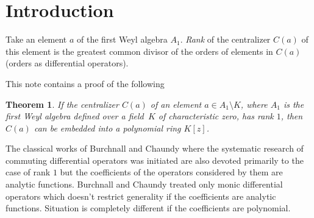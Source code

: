 \documentclass[pdftex]{sigma}
\numberwithin{equation}{section}
\newtheorem{Theorem}{Theorem}[section]
\begin{document}

\newcommand{\arXivNumber}{2101.01138}

\renewcommand{\PaperNumber}{052}

\FirstPageHeading










\section{Introduction}

Take an element $a$ of the first Weyl algebra $A_1$. {\it Rank} of the centralizer $C(a)$ of this element is
the greatest common divisor of the orders of elements in $C(a)$ (orders as differential operators).

This note contains a proof of the following

\begin{Theorem}If the centralizer $C(a)$ of an element $a \in A_1\setminus K$, where $A_1$ is the first Weyl algebra defined over a field~$K$
of characteristic zero, has rank $1$, then $C(a)$ can be embedded into a polynomial ring $K[z]$.
\end{Theorem}

The classical works of Burchnall and Chaundy where the systematic research
of commuting differential operators was initiated are also devoted primarily to
the case of rank $1$ but the coefficients of the operators considered by them
are analytic functions.
Burchnall and Chaundy treated only monic differential operators which
doesn't restrict generality if the coefficients are analytic functions.
Situation is completely different if the coefficients are polynomial.
\end{document}
